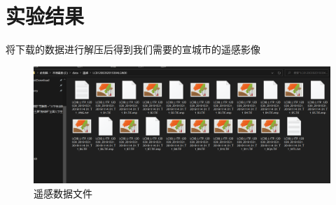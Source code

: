 \documentclass[12pt,a4paper]{article}
\begin{document}
	
	
	
	\section{实验结果}
	
	
	将下载的数据进行解压后得到我们需要的宣城市的遥感影像
	
		\begin{figure}[H]
		\centering
		\includegraphics[width=.7\textwidth]{res1}
		\caption{遥感数据文件}
		\label{fig:web4}
	\end{figure}
	
	
	

	

		
	
		
	
\end{document}
